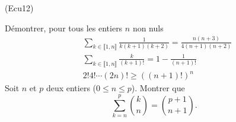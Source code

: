 \begin{tiny}(Ecu12)\end{tiny}
D{\'e}montrer, pour tous les entiers $n$ non nuls
\begin{align*}
&\sum_{k\in \llbracket 1,n \rrbracket }\frac{1}{k(k+1)(k+2)} = \frac{n(n+3)}{4(n+1)(n+2)} \\
&\sum_{k\in \llbracket 1,n \rrbracket }\frac{k}{(k+1)!} = 1-\frac{1}{(n+1)!} \\
&2!4!\cdots (2n)! \geq \left( (n+1)!\right)^{n}
\end{align*}
Soit $n$ et $p$ deux entiers ($0\leq n\leq p$). Montrer que
\begin{displaymath}
\sum_{k=n}^{p}\binom{k}{n}=\binom{p+1}{n+1} .
\end{displaymath}
